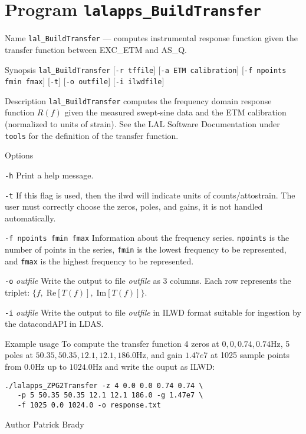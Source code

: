 \section{Program \texttt{lalapps\_BuildTransfer}}
\label{program:lalapps-BuildTransfer}

\begin{entry}

\item[Name]
\verb$lal_BuildTransfer$ --- computes instrumental response function given the 
transfer function between EXC\_ETM and AS\_Q.   

\item[Synopsis]
\verb$lal_BuildTransfer$ [\verb$-r tffile$] [\verb$-a ETM calibration$]
                         [\verb$-f npoints fmin fmax$] [\verb$-t$]
                         [\verb$-o outfile$] [\verb$-i ilwdfile$]
                         
\item[Description]
\verb$lal_BuildTransfer$ computes the frequency domain response
function $R(f)$ given the measured swept-sine data and the ETM
calibration (normalized to units of strain). See the LAL Software
Documentation under \texttt{tools} for the definition of the transfer
function.

\item[Options]\leavevmode
\begin{entry}
\item[\texttt{-h}]
Print a help message.
\item[\texttt{-t}]
If this flag is used,  then the ilwd will indicate units of
counts/attostrain.  The user must correctly choose the zeros, poles,
and gains,  it is not handled automatically.
\item[\texttt{-f npoints fmin fmax}] 
Information about the frequency series.  \verb$npoints$ is the number
of points in the series,  \verb$fmin$ is the lowest frequency to be
represented,  and \verb$fmax$ is the highest frequency to be
represented.   
\item[\texttt{-o} \textit{outfile}]
Write the output to file \textit{outfile} as 3 columns.  Each row
represents the triplet: $\{f,\; \textrm{Re}[T(f)],\; \textrm{Im}[T(f)]\}$.
\item[\texttt{-i} \textit{outfile}]
Write the output to file \textit{outfile} in ILWD format suitable for
ingestion by the datacondAPI in LDAS.
\end{entry}

\item[Example usage]
To compute the transfer function 4 zeros at $0,0,0.74,0.74$Hz,  5
poles at $50.35,50.35,12.1,12.1,186.0$Hz,  and gain $1.47e7$ at 1025
sample points from $0.0$Hz up to $1024.0$Hz and write the ouput as
ILWD:
\begin{verbatim}
./lalapps_ZPG2Transfer -z 4 0.0 0.0 0.74 0.74 \
   -p 5 50.35 50.35 12.1 12.1 186.0 -g 1.47e7 \
   -f 1025 0.0 1024.0 -o response.txt
\end{verbatim}

\item[Author]
Patrick Brady

\end{entry}
